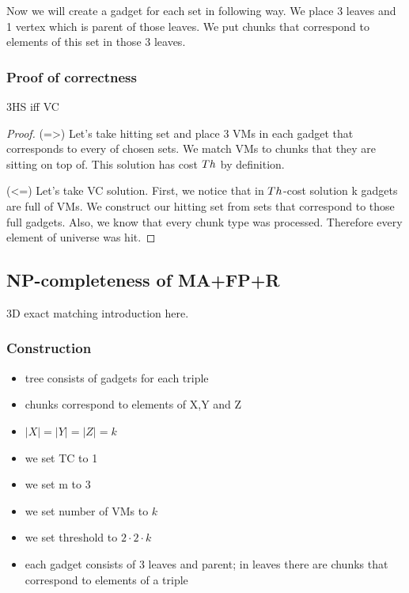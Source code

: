 Now we will create a gadget for each set in following way. We place 3
leaves and 1 vertex which is parent of those leaves. We put chunks
that correspond to elements of this set in those 3 leaves.

\subsubsection{Proof of correctness}
\begin{theorem}
3HS iff VC
\end{theorem}
\begin{proof}

(=>) Let's take hitting set and place 3 VMs in each gadget that
corresponds to every of chosen sets. We match VMs to chunks that they
are sitting on top of. This solution has cost $Th$ by definition.

(<=) Let's take VC solution. First, we notice that in $Th$-cost
solution k gadgets are full of VMs. We construct our hitting set from
sets that correspond to those full gadgets. Also, we know that every
chunk type was processed. Therefore every element of universe was hit.
\end{proof}

\subsection{NP-completeness of MA+FP+R}

3D exact matching introduction here.

\subsubsection{Construction}

\begin{itemize}
\item tree consists of gadgets for each triple
\item chunks correspond to elements of X,Y and Z
\item $|X| = |Y| = |Z| = k$
\item we set TC to 1
\item we set m to 3
\item we set number of VMs to $k$
\item we set threshold to $2 \cdot 2 \cdot k$
\item each gadget consists of 3 leaves and parent; in leaves there are
  chunks that correspond to elements of a triple
\end{itemize}

